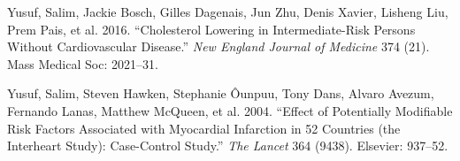 \documentclass[12pt,]{article}
\begin{document}
\hypertarget{ref-yusuf2016}{}
Yusuf, Salim, Jackie Bosch, Gilles Dagenais, Jun Zhu, Denis Xavier,
Lisheng Liu, Prem Pais, et al. 2016. ``Cholesterol Lowering in
Intermediate-Risk Persons Without Cardiovascular Disease.'' \emph{New
England Journal of Medicine} 374 (21). Mass Medical Soc: 2021--31.

\hypertarget{ref-yusuf2004effect}{}
Yusuf, Salim, Steven Hawken, Stephanie Ôunpuu, Tony Dans, Alvaro Avezum,
Fernando Lanas, Matthew McQueen, et al. 2004. ``Effect of Potentially
Modifiable Risk Factors Associated with Myocardial Infarction in 52
Countries (the Interheart Study): Case-Control Study.'' \emph{The
Lancet} 364 (9438). Elsevier: 937--52.
\end{document}
